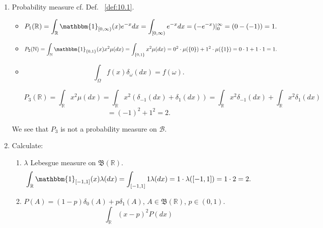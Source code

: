 \begin{exercise}[]
\begin{enumerate}[label=(\alph*)]
        \item Probability measure cf. Def. ~\ref{def:10.1}.
            \begin{itemize}
                \item 
                    \[
                    P_1(\mathbb{R}) = \int_{\mathbb{R}} \mathbbm{1}_{[0, \infty)}(x) e^{-x}dx
                    = \int_{[0, \infty)} e^{-x}dx 
                    = (-e^{-x})|_0^{\infty} = (0 - (-1)) = 1
                    .\] 
                \item
                    \[
                    P_2(\mathbb{N}) = \int_{\mathbb{N}} \mathbbm{1}_{\{0,1\} }(x) x^{2}\mu(dx) 
                    = \int_{\{0,1\} } x^{2}\mu(dx) = 0^{2}\cdot \mu(\{0\} ) + 1^{2}\cdot \mu(\{1\} ) 
                    = 0\cdot 1 + 1 \cdot 1 = 1
                    .\] 
                \item
                    \begin{tool}
                        \label{tool:iwrtadm} 
                        \[
                        \int_{\Omega} f(x) \delta_\omega(dx) = f(\omega)
                        .\] 
                    \end{tool}
                    \[
                    P_3(\mathbb{R}) = \int_{\mathbb{R}} x^{2}\mu(dx) 
                    = \int_{\mathbb{R}} x^{2} (\delta_{-1}(dx)+ \delta_1(dx))
                    = \int_{\mathbb{R}} x^{2} \delta_{-1}(dx) + \int_{\mathbb{R}}x^{2} \delta_1(dx)
                    \] 
                    \[
                    = (-1)^{2} + 1^{2} = 2
                    .\] 
            \end{itemize}
            We see that $P_3$ is not a probability measure on $\mathcal{B}$.

        \item Calculate:
            \begin{enumerate}[label=\arabic*.]
                \item $\lambda$ Lebesgue measure on $\mathfrak{B}(\mathbb{R})$.
                    \[
                    \int_{\mathbb{R}} \mathbbm{1}_{[-1,1]}(x) \lambda(dx)
                    = \int_{[-1,1]} 1 \lambda(dx) = 1 \cdot \lambda([-1,1]) = 1 \cdot 2 = 2
                    .\] 
                \item $P(A) = (1-p)\delta_0(A) + p \delta_1(A)$, $A \in \mathfrak{B}(\mathbb{R})$, $p \in (0,1)$.
                    \[
                    \int_{\mathbb{R}} (x-p)^{2}P(dx)
                    \] 
            \end{enumerate}
    \end{enumerate}
\end{exercise}
